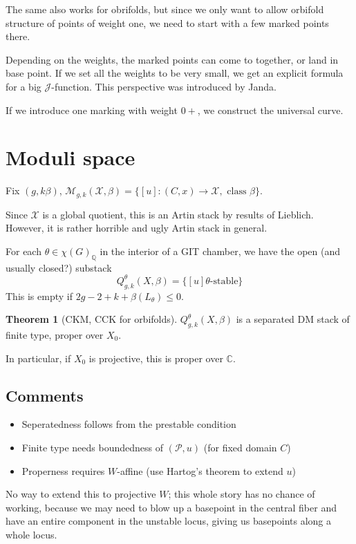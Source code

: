 \documentclass{amsart}
\theoremstyle{definition}
\newtheorem{theorem}[dummy]{Theorem}
\newcommand{\J}{\mathcal{J}}
\newcommand{\M}{\mathcal{M}}
\newcommand{\Q}{\mathbb{Q}}
\newcommand{\C}{\mathbb{C}}
\begin{document}
The same also works for obrifolds, but since we only want to allow orbifold structure of points of weight one, we need to start with a few marked points there.

Depending on the weights, the marked points can come to together, or land in base point.  If we set all the weights to be very small, we get an explicit formula for a big $\J$-function.  This perspective was introduced by Janda.

If we introduce one marking with weight $0+$, we construct the universal curve.

\section{Moduli space}

Fix $(g,k\beta)$, $\M_{g,k}(\mathcal{X},\beta)=\{[u]:(C,x)\to\mathcal{X}, \text{ class } \beta\}$.

Since $\mathcal{X}$ is a global quotient, this is an Artin stack by results of Lieblich.  However, it is rather horrible and ugly Artin stack in general.

For each $\theta\in\chi(G)_\Q$ in the interior of a GIT chamber, we have the open (and usually closed?) substack
$$Q^\theta_{g,k}(X,\beta)=\{[u] \theta\text{-stable}\}$$
This is empty if $2g-2+k+\beta(L_\theta)\leq 0$.

\begin{theorem}[CKM, CCK for orbifolds]
$Q^\theta_{g,k}(X,\beta)$ is a separated DM stack of finite type, proper over $X_0$.

\end{theorem}

In particular, if $X_0$ is projective, this is proper over $\C$.

\subsection{Comments}
\begin{itemize}
\item Seperatedness follows from the prestable condition
\item Finite type needs boundedness of $(\mathcal{P},u)$ (for fixed domain $C$)
\item Properness requires $W$-affine (use Hartog's theorem to extend $u$)


\end{itemize}
No way to extend this to projective $W$; this whole story has no chance of working, because we may need to blow up a basepoint in the central fiber and have an entire component in the unstable locus, giving us basepoints along a whole locus.
\end{document}
